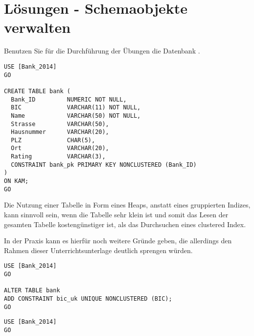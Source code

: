 \clearpage
    \section{Lösungen - Schemaobjekte verwalten}
      Benutzen Sie für die Durchführung der Übungen die Datenbank
      .
      \begin{enumerate}
        
        \begin{lstlisting}[language=ms_sql]
USE [Bank_2014]
GO

CREATE TABLE bank (
  Bank_ID         NUMERIC NOT NULL,
  BIC             VARCHAR(11) NOT NULL,
  Name            VARCHAR(50) NOT NULL,
  Strasse         VARCHAR(50),
  Hausnummer      VARCHAR(20),
  PLZ             CHAR(5),
  Ort             VARCHAR(20),
  Rating          VARCHAR(3),
  CONSTRAINT bank_pk PRIMARY KEY NONCLUSTERED (Bank_ID)
)
ON KAM;
GO
        \end{lstlisting}
        
        
        
        Die Nutzung einer Tabelle in Form eines Heaps, anstatt eines gruppierten
        Indizes, kann sinnvoll sein, wenn die Tabelle sehr klein ist und somit
        das Lesen der gesamten Tabelle kostengünstiger ist, als das Durchsuchen
        eines clustered Index. 
        
        In der Praxis kann es hierfür noch weitere Gründe geben, die allerdings
        den Rahmen dieser Unterrichtsunterlage deutlich sprengen würden.

\clearpage
        
        \begin{lstlisting}[language=ms_sql]
USE [Bank_2014]
GO

ALTER TABLE bank
ADD CONSTRAINT bic_uk UNIQUE NONCLUSTERED (BIC);
GO
        \end{lstlisting}
        
        
        \begin{lstlisting}[language=ms_sql]
USE [Bank_2014]
GO


\end{lstlisting}
\end{enumerate}
